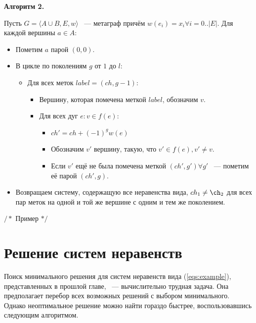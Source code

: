 \documentclass[14pt]{mmcs-article}
\begin{document}
\textbf{Алгоритм 2.}

Пусть $G = \langle A \cup B, E,w\rangle$ ~--- метаграф причём $w(e_i) = x_i \forall i = 0..|E|$. Для каждой вершины $a \in A:$

\begin{itemize}
    \item Пометим $a$ парой $(0, 0)$.
    \item В цикле по поколениям $g$ от $1$ до $l$:
      \begin{itemize}
      \item Для всех меток $label = (ch, g - 1)$:
        \begin{itemize}
        \item Вершину, которая помечена меткой $label$, обозначим $v$.
        \item Для всех дуг $e: v \in f(e)$:
          \begin{itemize}
          \item $ch' = ch + (-1)^{g} w(e)$
          \item Обозначим $v'$ вершину, такую, что $v' \in f(e), v' \neq v$.
          \item Если $v'$ ещё не была помечена меткой $(ch', g') \forall g'$ ~--- пометим её парой $(ch', g)$.
          \end{itemize}
        \end{itemize}
      \end{itemize}
    \item Возвращаем систему, содержащую все неравенства вида, $ch_1 \neq \ch_2$ для всех пар меток на одной и той же вершине с одним и тем же поколением.
\end{itemize}

$/*$ Пример $*/$

\section*{Решение систем неравенств}



Поиск минимального решения для систем неравенств вида (\ref{eqs:example}), представленных в прошлой главе, ~--- вычислительно трудная задача. Она предполагает перебор всех возможных решений с выбором минимального. Однако неоптимальное решение можно найти гораздо быстрее, воспользовавшись следующим алгоритмом.
\end{document}
